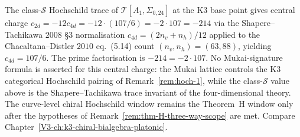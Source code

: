 \begin{remark}[Class-$\mathcal S$ Hochschild trace at $c_{2d} = -214$]
\label{rem:hoch-2}
The class-$\mathcal S$ Hochschild trace of $\mathcal T[A_1,\Sigma_{0,24}]$
at the K3 base point gives central charge
$c_{2d} = -12 c_{4d} = -12\cdot(107/6) = -2\cdot 107 = -214$ via the
Shapere--Tachikawa $2008$ \S 3 normalisation
$c_{4d} = (2n_v + n_h)/12$ applied to the Chacaltana--Distler $2010$
eq.~(5.14) count $(n_v, n_h) = (63, 88)$, yielding $c_{4d} = 107/6$.
The prime factorisation is \( -214=-2\cdot107\). No Mukai-signature
formula is asserted for this central charge: the Mukai lattice controls
the K3 categorical Hochschild pairing of
Remark~\ref{rem:hoch-1}, while the class-\(\mathcal S\) value above is
the Shapere--Tachikawa trace invariant of the four-dimensional theory.
The curve-level chiral Hochschild window remains the Theorem~H window
only after the hypotheses of Remark~\ref{rem:thm-H-three-way-scope} are
met.
Compare Chapter~\ref{V3-ch:k3-chiral-bialgebra-platonic}.
\end{remark}
